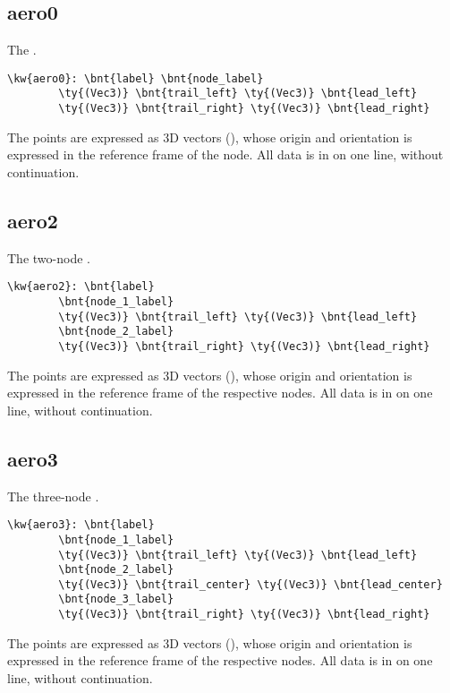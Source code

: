 \subsection{aero0}
The .
\begin{Verbatim}[commandchars=\\\{\}]
    \kw{aero0}: \bnt{label} \bnt{node_label}
        \ty{(Vec3)} \bnt{trail_left} \ty{(Vec3)} \bnt{lead_left}
        \ty{(Vec3)} \bnt{trail_right} \ty{(Vec3)} \bnt{lead_right}
\end{Verbatim}
The points are expressed as 3D vectors (), whose origin and orientation
is expressed in the reference frame of the node.
All data is in on one line, without continuation.

\subsection{aero2}
The two-node .
\begin{Verbatim}[commandchars=\\\{\}]
    \kw{aero2}: \bnt{label}
        \bnt{node_1_label}
        \ty{(Vec3)} \bnt{trail_left} \ty{(Vec3)} \bnt{lead_left}
        \bnt{node_2_label}
        \ty{(Vec3)} \bnt{trail_right} \ty{(Vec3)} \bnt{lead_right}
\end{Verbatim}
The points are expressed as 3D vectors (), whose origin and orientation
is expressed in the reference frame of the respective nodes.
All data is in on one line, without continuation.

\subsection{aero3}
The three-node .
\begin{Verbatim}[commandchars=\\\{\}]
    \kw{aero3}: \bnt{label}
        \bnt{node_1_label}
        \ty{(Vec3)} \bnt{trail_left} \ty{(Vec3)} \bnt{lead_left}
        \bnt{node_2_label}
        \ty{(Vec3)} \bnt{trail_center} \ty{(Vec3)} \bnt{lead_center}
        \bnt{node_3_label}
        \ty{(Vec3)} \bnt{trail_right} \ty{(Vec3)} \bnt{lead_right}
\end{Verbatim}
The points are expressed as 3D vectors (), whose origin and orientation
is expressed in the reference frame of the respective nodes.
All data is in on one line, without continuation.


